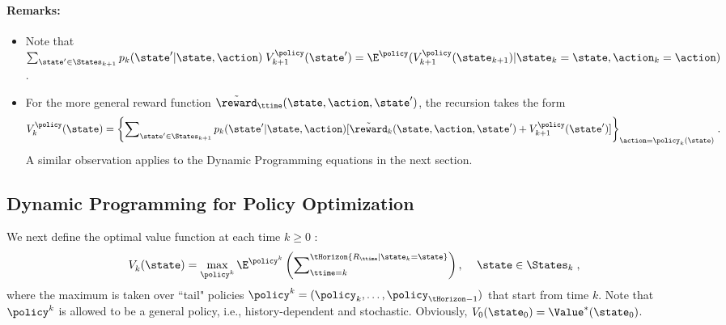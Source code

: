 \paragraph{Remarks:}
\begin{itemize}
  \item Note that $\sum\nolimits_{\state' \in {\States_{k + 1}}} {{p_k}(\state'|\state,\action)} \;V_{k + 1}^\policy (\state') = {\E^\policy }(V_{k + 1}^\policy ({\state_{k + 1}})|{\state_k} = \state,{\action_k} = \action)$.
  \item For the more general reward function ${\tilde \reward_\ttime}(\state,\action,\state')$, the recursion takes the form
                     \[V_k^\policy (\state) = {\left\{ {\sum\nolimits_{\state' \in {\States_{k + 1}}} {{p_k}(\state'|\state,\action)} [{\tilde \reward_k}(\state,\action,\state') + V_{k + 1}^\policy (\state')]} \right\}_{\action = {\policy _k}(\state)}}\;.\]
                      A similar observation applies to the Dynamic Programming
equations in the next section.
\end{itemize}

\subsection{Dynamic Programming for Policy Optimization}

We next define the optimal value function at each time $k \ge 0$ :
\[
V_k^{}(\state) = \mathop {\max }\limits_{{\policy ^k}} {\E^{{\policy
^k}}}\left( {\sum\nolimits_{\ttime = k}^\tHorizon
{{R_\ttime}|{\state_k} = \state} } \right),\quad \,\state \in
{\States_k} \;,
\]
where the maximum is taken over ``tail" policies ${\policy ^k} =
({\policy_k}, \ldots ,{\policy _{\tHorizon -1}})$ that start from
time $k$. Note that ${\policy ^k}$ is allowed to be a general
policy, i.e., history-dependent and stochastic. Obviously,
${V_0}({\state_0}) = {\Value^*}({\state_0})$.

